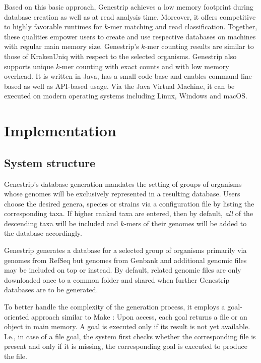 \documentclass[pdflatex,sn-vancouver-num]{sn-jnl}
\begin{document}
    Based on this basic approach, Genestrip achieves a low memory footprint during database creation as well as at read analysis time. Moreover, it offers competitive to highly favorable runtimes for $k$-mer matching and read classification. Together, these qualities empower users to create and use respective databases on machines with regular main memory size. Genestrip's $k$-mer counting results are similar to those of KrakenUniq \citep{krakenUniq} with respect to the selected organisms. Genestrip also supports unique $k$-mer counting with exact counts and with low memory overhead.
It is written in Java, has a small code base and enables command-line-based as well as API-based usage. Via the Java Virtual Machine, it can be executed on  modern operating systems including Linux, Windows and macOS.
   
    \section{Implementation}\label{methods}

    \subsection{System structure}
\label{system}

    Genestrip's database generation mandates the setting of groups of organisms whose genomes will be exclusively represented in a resulting database. Users choose the desired genera, species or strains via a configuration file by listing the corresponding taxa. If higher ranked taxa are entered, then by default, \emph{all} of the descending taxa will be included and $k$-mers of their genomes will be added to the database accordingly.

    Genestrip generates a database for a selected group of organisms primarily via
    genomes from RefSeq \citep{refseq} but genomes from Genbank and additional genomic files may be included on top or instead. By default, related genomic files are only downloaded once to a common folder and shared when further Genestrip databases are to be generated.
    
    To better handle the complexity of the generation process, it employs a goal-oriented approach similar to Make \citep{feldman1979make}: Upon access, each goal returns a file or an object in main memory. A goal is executed only if its result is not yet available. I.e., in case of a file goal, the system first checks whether the corresponding file is present and only if it is missing, the corresponding goal is executed to produce the file. 
    
\end{document}
